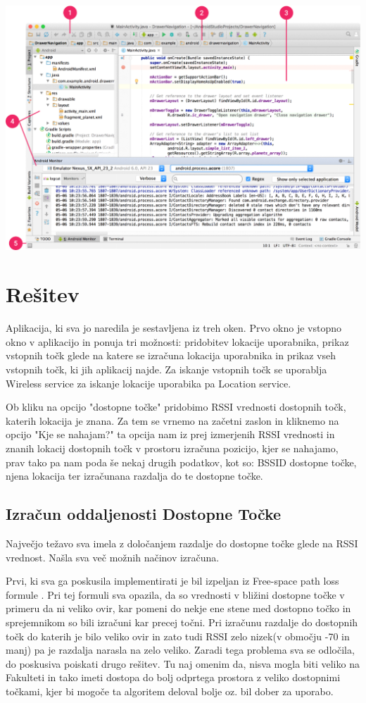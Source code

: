 \documentclass[11pt,a4paper,slovene]{article}
\begin{document}
\includegraphics[scale=0.5]{slike/AndroidStudio.png}

\newpage

\section{Rešitev}
Aplikacija, ki sva jo naredila je sestavljena iz treh oken.
Prvo okno je vstopno okno v aplikacijo in ponuja tri možnosti: pridobitev lokacije uporabnika, prikaz vstopnih točk glede na katere se izračuna lokacija uporabnika in prikaz vseh vstopnih točk, ki jih aplikacij najde.
Za iskanje vstopnih točk se uporablja Wireless service za iskanje lokacije uporabika pa Location service.

Ob kliku na opcijo "dostopne točke" pridobimo RSSI vrednosti dostopnih točk, katerih lokacija je znana. Za tem se vrnemo na začetni zaslon in kliknemo na opcijo "Kje se nahajam?" ta opcija nam iz prej izmerjenih RSSI vrednosti in znanih lokacij dostopnih točk v prostoru izračuna pozicijo, kjer se nahajamo, prav tako pa nam poda še nekaj drugih podatkov, kot so: BSSID dostopne točke, njena lokacija ter izračunana razdalja do te dostopne točke.

\subsection{Izračun oddaljenosti Dostopne Točke}
Največjo težavo sva imela z določanjem razdalje do dostopne točke glede na RSSI vrednost. Našla sva več možnih načinov izračuna.

Prvi, ki sva ga poskusila implementirati je bil izpeljan iz Free-space path loss formule \cite{freespace}. Pri tej formuli sva opazila, da so vrednosti v bližini dostopne točke v primeru da ni veliko ovir, kar pomeni do nekje ene stene med dostopno točko in sprejemnikom so bili izračuni kar precej točni. Pri izračunu razdalje do dostopnih točk do katerih je bilo veliko ovir in zato tudi RSSI zelo nizek(v območju -70 in manj) pa je razdalja narasla na zelo veliko. 
Zaradi tega problema sva se odločila, do poskusiva poiskati drugo rešitev.
Tu naj omenim da, nisva mogla biti veliko na Fakulteti in tako imeti dostopa do bolj odprtega prostora z veliko dostopnimi točkami, kjer bi mogoče ta algoritem deloval bolje oz. bil dober za uporabo.
\end{document}

